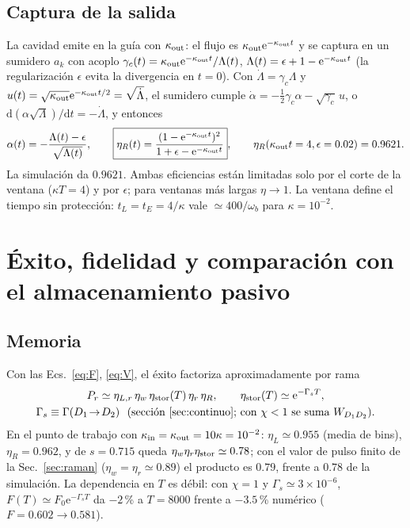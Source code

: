 \documentclass[11pt,a4paper]{article}
\newcommand{\ee}{\mathrm{e}}
\newcommand{\wb}{\omega_b}
\begin{document}
\subsection{Captura de la salida}
La cavidad emite en la guía con $\kappa_{\rm out}$: el flujo es $\kappa_{\rm out}\ee^{-\kappa_{\rm out}t}$ y se captura en un sumidero $a_k$ con acoplo
$\gamma_c(t)=\kappa_{\rm out}\ee^{-\kappa_{\rm out}t}/\Lambda(t)$, $\Lambda(t)=\epsilon+1-\ee^{-\kappa_{\rm out}t}$ (la regularización $\epsilon$ evita la divergencia en $t=0$).
Con $\dot\Lambda=\gamma_c\Lambda$ y $u(t)=\sqrt{\kappa_{\rm out}}\ee^{-\kappa_{\rm out}t/2}=\sqrt{\dot\Lambda}$, el sumidero cumple $\dot\alpha=-\tfrac12\gamma_c\alpha-\sqrt{\gamma_c}\,u$, o
$\mathrm d(\alpha\sqrt\Lambda)/\mathrm dt=-\dot\Lambda$, y entonces
\begin{equation}
\alpha(t)=-\frac{\Lambda(t)-\epsilon}{\sqrt{\Lambda(t)}},\qquad
\boxed{\eta_R(t)=\frac{(1-\ee^{-\kappa_{\rm out}t})^2}{1+\epsilon-\ee^{-\kappa_{\rm out}t}}},\qquad
\eta_R(\kappa_{\rm out}t=4,\epsilon=0.02)=0.9621 . \label{eq:etaR}
\end{equation}
La simulación da $0.9621$. Ambas eficiencias están limitadas solo por el corte de la ventana ($\kappa T=4$) y por $\epsilon$; para ventanas más largas $\eta\to1$.
La ventana define el tiempo sin protección: $t_L=t_E=4/\kappa$ vale $\simeq400/\wb$ para $\kappa=10^{-2}$.

\section{Éxito, fidelidad y comparación con el almacenamiento pasivo}\label{sec:presupuesto}
\subsection{Memoria}
Con las Ecs.~\eqref{eq:F}, \eqref{eq:V}, el éxito factoriza aproximadamente por rama
\begin{gather}
P_r\simeq\eta_{L,r}\,\eta_w\,\eta_{\rm stor}(T)\,\eta_r\,\eta_R,\qquad
\eta_{\rm stor}(T)\simeq\ee^{-\Gamma_sT},\nonumber\\
\Gamma_s\equiv\Gamma(D_1\!\to\!D_2)\ \ (\text{sección \ref{sec:continuo}; con }\chi<1\text{ se suma }W_{D_1D_2}).
\end{gather}
En el punto de trabajo con $\kappa_{\rm in}=\kappa_{\rm out}=10\kappa=10^{-2}$: $\eta_L\simeq0.955$ (media de bins), $\eta_R=0.962$, y de $s=0.715$ queda
$\eta_w\eta_r\eta_{\rm stor}\simeq0.78$; con el valor de pulso finito de la Sec.~\ref{sec:raman} ($\eta_w=\eta_r\simeq0.89$) el producto es $0.79$, frente a $0.78$ de la simulación.
La dependencia en $T$ es débil: con $\chi=1$ y $\Gamma_s\simeq3\times10^{-6}$, $F(T)\simeq F_0\ee^{-\Gamma_sT}$ da $-2$\,\% a $T=8000$ frente a $-3.5$\,\% numérico ($F=0.602\to0.581$).
\end{document}
